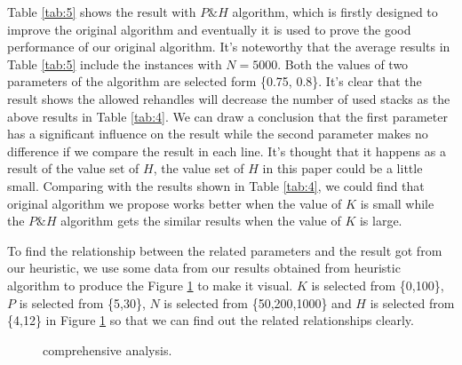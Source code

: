 \documentclass[review,3p,times,authoryear,12pt]{elsarticle}
\begin{document}
Table \ref{tab:5} shows the result with $P\&H$ algorithm, which is firstly designed to improve the original algorithm and eventually it is used to prove the good performance of our original algorithm.
It's noteworthy that the average results in Table \ref{tab:5} include the instances with $N=5000$.
Both the values of two parameters of the algorithm are selected form \{0.75, 0.8\}.
It's clear that the result shows the allowed rehandles will decrease the number of used stacks as the above results in Table \ref{tab:4}.
We can draw a conclusion that the first parameter has a significant influence on the result while the second parameter makes no difference if we compare the result in each line.
It's thought that it happens as a result of the value set of $H$, the value set of $H$ in this paper could be a little small.
Comparing with the results shown in Table \ref{tab:4}, we could find that original algorithm we propose works better when the value of $K$ is small while the $P\&H$ algorithm
gets the similar results when the value of $K$ is large.

To find the relationship between the related parameters and the result got from our heuristic, we use some data from our results obtained from heuristic algorithm to
produce the Figure \ref{fig 5:graph} to make it visual.
$K$ is selected from \{0,100\}, $P$ is selected from \{5,30\}, $N$ is selected from \{50,200,1000\} and $H$ is selected from \{4,12\} in Figure \ref{fig 5:graph} so that we can find out the related relationships clearly.

\begin{figure}[htbp]
\centering
\setlength{\abovecaptionskip}{10pt}
\caption{comprehensive analysis.}
\label{fig 5:graph}
\end{figure}
\end{document}
